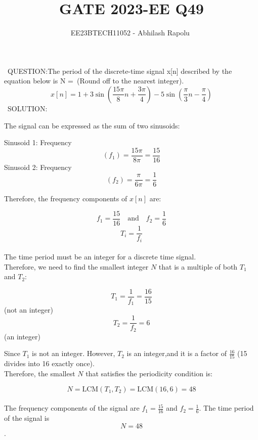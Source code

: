 \documentclass[journal,12pt,twocolumn]{IEEEtran}
\title{GATE 2023-EE Q49}
\author{EE23BTECH11052 - Abhilash Rapolu $^{}$%
}
\begin{document}
\maketitle
\newpage
\bigskip
\ QUESTION:The period of the discrete-time signal x[n] described by the equation below is N =\ (Round off to the nearest integer).
$$x[n] = 1 + 3\sin\left(\frac{15\pi}{8}n + \frac{3\pi}{4}\right) - 5\sin\left(\frac{\pi}{3}n - \frac{\pi}{4}\right)$$
\ SOLUTION:  

The signal can be expressed as the sum of two sinusoids:

 Sinusoid 1: Frequency $$(f_1) = \frac{15\pi}{8\pi} = \frac{15}{16}$$
 Sinusoid 2: Frequency $$(f_2) = \frac{\pi}{6\pi} = \frac{1}{6}$$

Therefore, the frequency components of $x[n]$ are:

$$f_1 = \frac{15}{16} \quad \text{and} \quad f_2 = \frac{1}{6}$$
 $$T_i = \frac{1}{f_i}$$ 
\\The time period must be an integer for a discrete time signal.
\\Therefore, we need to find the smallest integer $N$ that is a multiple of both $T_1$ and $T_2$:

 $$T_1 = \frac{1}{f_1} = \frac{16}{15}$$ (not an integer)
 $$T_2 = \frac{1}{f_2} = 6$$ (an integer)

Since $T_1$ is not an integer. However, $T_2$ is an integer,and it is a factor of $\frac{16}{15}$ (15 divides into 16 exactly once). 
\\Therefore, the smallest $N$ that satisfies the periodicity condition is:

$$N = \text{LCM}(T_1, T_2) = \text{LCM}(16, 6) = 48$$
\\The frequency components of the signal are $f_1 = \frac{15}{16}$ and $f_2 = \frac{1}{6}$. The time period of the signal is $$N =48$$.
\end{document}
